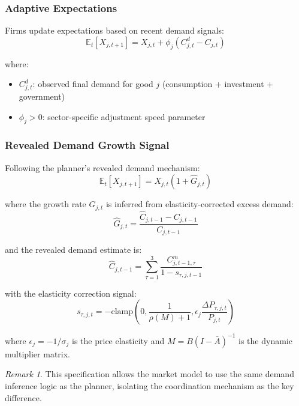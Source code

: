 \documentclass[12pt,a4paper]{article}
\theoremstyle{definition}
\theoremstyle{remark}
\newtheorem{remark}[theorem]{Remark}
\newcommand{\E}{\mathbb{E}}
\begin{document}
\subsubsection{Adaptive Expectations}

Firms update expectations based on recent demand signals:
\begin{equation}
    \E_t[X_{j,t+1}] = X_{j,t} + \phi_j \left(C_{j,t}^d - C_{j,t}\right)
\end{equation}

where:
\begin{itemize}
    \item $C_{j,t}^d$: observed final demand for good $j$ (consumption + investment + government)
    \item $\phi_j > 0$: sector-specific adjustment speed parameter
\end{itemize}

\subsubsection{Revealed Demand Growth Signal}

Following the planner's revealed demand mechanism:
\begin{equation}
    \E_t[X_{j,t+1}] = X_{j,t}(1 + \hat{G}_{j,t})
\end{equation}

where the growth rate $\hat{G}_{j,t}$ is inferred from elasticity-corrected excess demand:
\begin{equation}
    \hat{G}_{j,t} = \frac{\hat{C}_{j,t-1} - C_{j,t-1}}{C_{j,t-1}}
\end{equation}

and the revealed demand estimate is:
\begin{equation}
    \hat{C}_{j,t-1} = \sum_{\tau=1}^{3} \frac{C_{j,t-1,\tau}^m}{1 - s_{\tau,j,t-1}}
\end{equation}

with the elasticity correction signal:
\begin{equation}
    s_{\tau,j,t} = -\text{clamp}\left(0, \frac{1}{\rho(M) + 1}, \epsilon_j \frac{\Delta P_{\tau,j,t}}{P_{j,t}}\right)
\end{equation}

where $\epsilon_j = -1/\sigma_j$ is the price elasticity and $M = B(I - \bar{A})^{-1}$ is the dynamic multiplier matrix.

\begin{remark}
This specification allows the market model to use the same demand inference logic as the planner, isolating the coordination mechanism as the key difference.
\end{remark}
\end{document}
